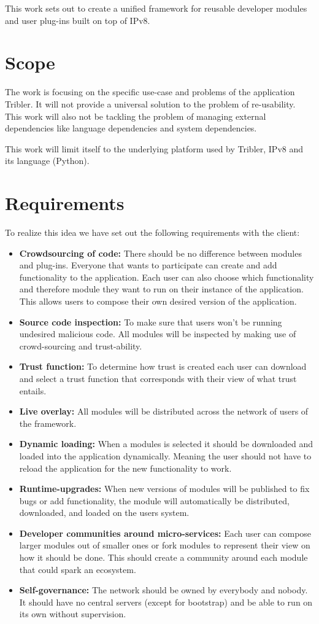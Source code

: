 This work sets out to create a unified framework for reusable developer modules and user plug-ins built on top of IPv8.

\section{Scope}
The work is focusing on the specific use-case and problems of the application Tribler. It will not provide a universal solution to the problem of re-usability. This work will also not be tackling the problem of managing external dependencies like language dependencies and system dependencies.

This work will limit itself to the underlying platform used by Tribler, IPv8 and its language (Python).

\section{Requirements}
To realize this idea we have set out the following requirements with the client:

\begin{itemize}
	\item \textbf{Crowdsourcing of code: } There should be no difference between modules and plug-ins. Everyone that wants to participate can create and add functionality to the application. Each user can also choose which functionality and therefore module they want to run on their instance of the application. This allows users to compose their own desired version of the application.
	\item \textbf{Source code inspection: } To make sure that users won't be running undesired malicious code. All modules will be inspected by making use of crowd-sourcing and trust-ability.
	\item \textbf{Trust function: } To determine how trust is created each user can download and select a trust function that corresponds with their view of what trust entails.
	\item \textbf{Live overlay: } All modules will be distributed across the network of users of the framework.
	\item \textbf{Dynamic loading: } When a modules is selected it should be downloaded and loaded into the application dynamically. Meaning the user should not have to reload the application for the new functionality to work.
	\item \textbf{Runtime-upgrades: } When new versions of modules will be published to fix bugs or add functionality, the module will automatically be distributed, downloaded, and loaded on the users system.
	\item \textbf{Developer communities around micro-services: } Each user can compose larger modules out of smaller ones or fork modules to represent their view on how it should be done. This should create a community around each module that could spark an ecosystem.
	\item \textbf{Self-governance: } The network should be owned by everybody and nobody. It should have no central servers (except for bootstrap) and be able to run on its own without supervision.
\end{itemize}

